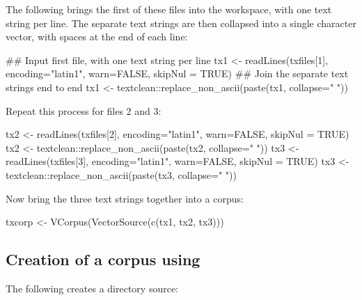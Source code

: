 The following brings the first of these files into the workspace,
with one text string per line. The separate text strings are then
collapsed into a single character vector, with spaces at the end
of each line:
\begin{fullwidth}
\begin{Schunk}
\begin{Sinput}
## Input first file, with one text string per line
tx1 <- readLines(txfiles[1], encoding="latin1", warn=FALSE, 
                 skipNul = TRUE)
## Join the separate text strings end to end
tx1 <- textclean::replace_non_ascii(paste(tx1, collapse=" "))
\end{Sinput}
\end{Schunk}
\end{fullwidth}

Repeat this process for files 2 and 3:
\begin{fullwidth}
\begin{Schunk}
\begin{Sinput}
tx2 <- readLines(txfiles[2], encoding="latin1", warn=FALSE, 
                 skipNul = TRUE)
tx2 <- textclean::replace_non_ascii(paste(tx2, collapse=" "))
tx3 <- readLines(txfiles[3], encoding="latin1", warn=FALSE, 
                 skipNul = TRUE)
tx3 <- textclean::replace_non_ascii(paste(tx3, collapse=" "))
\end{Sinput}
\end{Schunk}
\end{fullwidth}

Now bring the three text strings together into a corpus:
\begin{Schunk}
\begin{Sinput}
txcorp <- VCorpus(VectorSource(c(tx1, tx2, tx3)))
\end{Sinput}
\end{Schunk}

\subsection*{Creation of a corpus using }

The following creates a directory source:
\begin{Schunk}
\end{Schunk}

